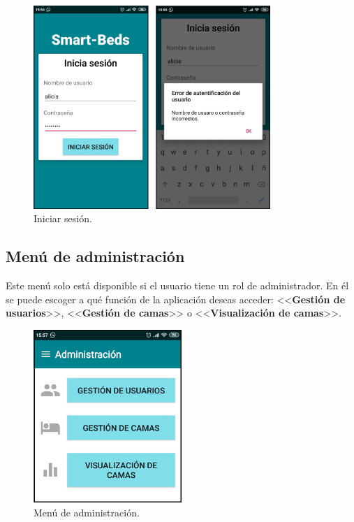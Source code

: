 \begin{figure}[H]
	\centering
	\includegraphics[width=0.8\textwidth]{../img/iniciasesion.png}
	\caption{Iniciar sesión.}
	\label{fig:iniciasesion}
\end{figure}

\subsection{Menú de administración}

Este menú solo está disponible si el usuario tiene un rol de administrador. En él se puede escoger a qué función de la aplicación deseas acceder: <<\textbf{Gestión de usuarios}>>, <<\textbf{Gestión de camas}>> o <<\textbf{Visualización de camas}>>. 

\begin{figure}[H]
	\centering
	\includegraphics[width=0.5\textwidth]{../img/menudeadministracion.png}
	\caption{Menú de administración.}
	\label{fig:menudeadministracion}
\end{figure}


